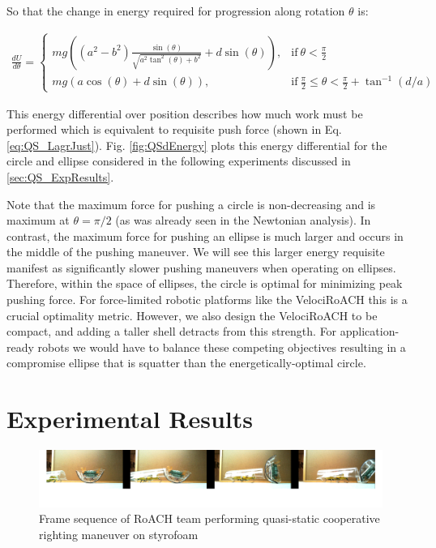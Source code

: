 \documentclass[letterpaper]{report}
\begin{document}
So that the change in energy required for progression along rotation $\theta$ is:

\begin{align}
  \frac{d U}{d \theta} =
  \begin{cases}
    mg ( (a^2 - b^2) \frac{\sin(\theta)}{\sqrt{a^2 \tan^2(\theta) + b^2}} + d \sin(\theta) ), & \text{if}\ \theta < \frac{\pi}{2} \\
    mg (a \cos(\theta) + d \sin(\theta) ), & \text{if}\ \frac{\pi}{2} \leq \theta < \frac{\pi}{2} + \tan^{-1}(d/a)
  \end{cases}
  \label{eq:QSdEnergy}
\end{align}

This energy differential over position describes how much work must be performed which is equivalent to requisite push force (shown in Eq. \ref{eq:QS_LagrJust}).
Fig. \ref{fig:QSdEnergy} plots this energy differential for the circle and ellipse considered in the following experiments discussed in \ref{sec:QS_ExpResults}.

Note that the maximum force for pushing a circle is non-decreasing and is maximum at $\theta = \pi/2$ (as was already seen in the Newtonian analysis).
In contrast, the maximum force for pushing an ellipse is much larger and occurs in the middle of the pushing maneuver.
We will see this larger energy requisite manifest as significantly slower pushing maneuvers when operating on ellipses.
Therefore, within the space of ellipses, the circle is optimal for minimizing peak pushing force.
For force-limited robotic platforms like the VelociRoACH this is a crucial optimality metric.
However, we also design the VelociRoACH to be compact, and adding a taller shell detracts from this strength.
For application-ready robots we would have to balance these competing objectives resulting in a compromise ellipse that is squatter than the energetically-optimal circle.

\section{Experimental Results \label{sec:QS_ExpResults}}
\begin{figure}[ht]
\centering
\includegraphics[width=1.0\textwidth]{QSFlipStrip3.png}
\caption{Frame sequence of RoACH team performing quasi-static cooperative righting maneuver on styrofoam}
\end{figure}
\end{document}
